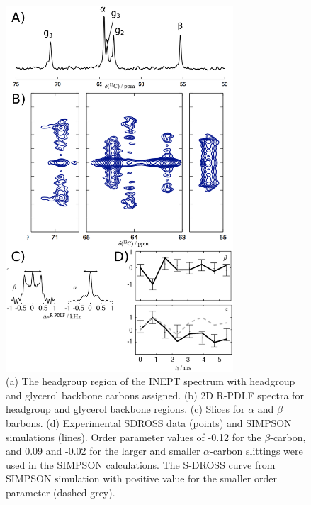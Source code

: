 \documentclass[aps,prl,superscriptaddress,twocolumn]{revtex4}
\begin{document}
\begin{figure}[!htb]
  \centering
  \includegraphics[width=8.5cm]{../scratch/figIDEA.eps}
  \caption{\label{PShgSIGNSsimpson}
    (a) The headgroup region of the INEPT spectrum with headgroup and glycerol backbone carbons assigned.
    (b) 2D R-PDLF spectra for headgroup and glycerol backbone regions.
    (c) Slices for $\alpha$ and $\beta$ barbons.
    (d) Experimental SDROSS data (points) and SIMPSON simulations (lines).
    Order parameter values of -0.12 for the $\beta$-carbon, and 0.09 and -0.02
    for the larger and smaller $\alpha$-carbon slittings were used in the
    SIMPSON calculations. The S-DROSS curve from SIMPSON simulation with positive value
    for the smaller order parameter (dashed grey).
  }
\end{figure}

\end{document}
